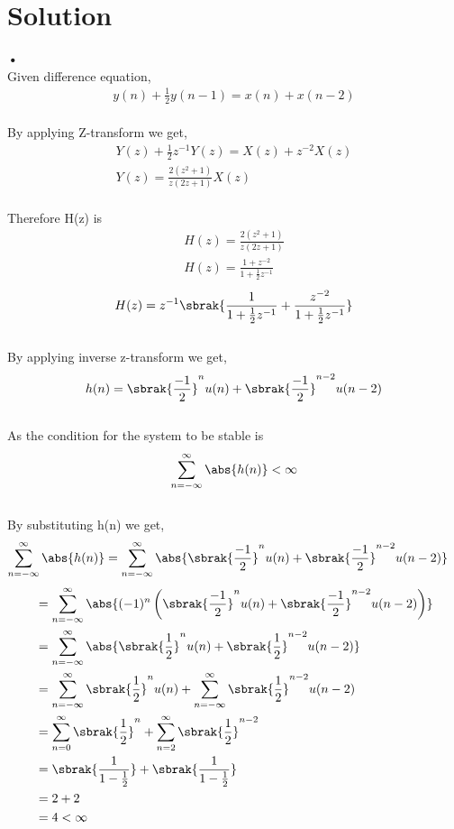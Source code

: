 \documentclass[journal,12pt,twocolumn]{IEEEtran}
\begin{document}
\section{Solution}
\textbf{•}
\\
Given difference equation,
\begin{align}
y(n)+\frac{1}{2}y(n-1) = x(n)+x(n-2) 
\end{align}\\
By applying Z-transform we get, \\
\begin{align}
Y(z) + \frac{1}{2}z^{-1}Y(z)=X(z) + z^{-2}X(z)\\
Y(z)=\frac{2(z^2+1)}{z(2z+1)}X(z)
\end{align}\\
Therefore H(z) is \\
\begin{align}
H(z) = \frac{2(z^2+1)}{z(2z+1)} \\
H(z) = \frac{1+z^{-2}}{1+\frac{1}{2}z^{-1}}
\end{align}
\begin{align}
H(z)= z^{-1}\sbrak{\frac{1}{1+\frac{1}{2}z^{-1}} + \frac{z^{-2}}{1+\frac{1}{2}z^{-1}}}
\end{align}\\
By applying inverse z-transform we get,\\
\begin{align}
    h(n)=\sbrak{\frac{-1}{2}}^nu(n) + \sbrak{\frac{-1}{2}}^{n-2}u(n-2)
\end{align}\\
As the condition for the system to be stable is
\begin{align}
\sum_{n=-\infty}^{\infty} \abs{h(n)} < \infty
\end{align}\\
By substituting h(n) we get,\\
\begin{align}
\sum_{n=-\infty}^{\infty} \abs{h(n)} &= \sum_{n=-\infty}^{\infty}\abs{\sbrak{\frac{-1}{2}}^nu(n) + \sbrak{\frac{-1}{2}}^{n-2}u(n-2)}
\end{align}
\begin{align}
&= 
\sum_{n=-\infty}^{\infty}\abs{(-1)^n \left( \sbrak{\frac{-1}{2}}^nu(n) + \sbrak{\frac{-1}{2}}^{n-2}u(n-2) \right)}  \\
&= 
\sum_{n=-\infty}^{\infty}\abs{\sbrak{\frac{1}{2}}^nu(n) + \sbrak{\frac{1}{2}}^{n-2}u(n-2)} \\
&=
\sum_{n=-\infty}^{\infty}\sbrak{\frac{1}{2}}^nu(n)+\sum_{n=-\infty}^{\infty}\sbrak{\frac{1}{2}}^{n-2}u(n-2)\\
&=
\sum_{n=0}^{\infty}\sbrak{\frac{1}{2}}^n+\sum_{n=2}^{\infty}\sbrak{\frac{1}{2}}^{n-2}\\
&=
\sbrak{\frac{1}{1-\frac{1}{2}}}+\sbrak{\frac{1}{1-\frac{1}{2}}}\\
&=
2+2\\
&=
4 < \infty
\end{align}\\
\end{document}
